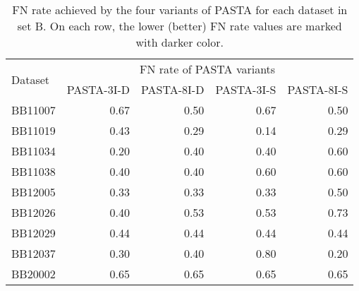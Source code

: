 \begin{table}[!htbp]
	\centering
	\small
	\caption{FN rate achieved by the four variants of PASTA for each dataset in set B. On each row, the lower (better) FN rate values are marked with darker color.}
	\begin{tabular}{|l|r|r|r|r|}
		\hline
		\multirow{2}{*}{Dataset} & \multicolumn{4}{c|}{FN rate of PASTA variants} \\
		\cline{2-5}          & \multicolumn{1}{l|}{PASTA-3I-D} & \multicolumn{1}{l|}{PASTA-8I-D} & \multicolumn{1}{l|}{PASTA-3I-S} & \multicolumn{1}{l|}{PASTA-8I-S} \\
		\hline
		BB11007 & \cellcolor[rgb]{ .988,  1,  .992}0.67 & \cellcolor[rgb]{ .384,  .745,  .478}0.50 & \cellcolor[rgb]{ .988,  1,  .992}0.67 & \cellcolor[rgb]{ .384,  .745,  .478}0.50 \\
		\hline
		BB11019 & \cellcolor[rgb]{ .988,  1,  .992}0.43 & \cellcolor[rgb]{ .682,  .871,  .733}0.29 & \cellcolor[rgb]{ .384,  .745,  .478}0.14 & \cellcolor[rgb]{ .682,  .871,  .733}0.29 \\
		\hline
		BB11034 & \cellcolor[rgb]{ .384,  .745,  .478}0.20 & \cellcolor[rgb]{ .686,  .871,  .733}0.40 & \cellcolor[rgb]{ .686,  .871,  .733}0.40 & \cellcolor[rgb]{ .988,  1,  .992}0.60 \\
		\hline
		BB11038 & \cellcolor[rgb]{ .384,  .745,  .478}0.40 & \cellcolor[rgb]{ .384,  .745,  .478}0.40 & \cellcolor[rgb]{ .988,  1,  .992}0.60 & \cellcolor[rgb]{ .988,  1,  .992}0.60 \\
		\hline
		BB12005 & \cellcolor[rgb]{ .384,  .745,  .478}0.33 & \cellcolor[rgb]{ .384,  .745,  .478}0.33 & \cellcolor[rgb]{ .384,  .745,  .478}0.33 & \cellcolor[rgb]{ .988,  1,  .992}0.50 \\
		\hline
		BB12026 & \cellcolor[rgb]{ .384,  .745,  .478}0.40 & \cellcolor[rgb]{ .624,  .843,  .682}0.53 & \cellcolor[rgb]{ .624,  .843,  .682}0.53 & \cellcolor[rgb]{ .988,  1,  .992}0.73 \\
		\hline
		BB12029 & \cellcolor[rgb]{ .988,  1,  .992}0.44 & \cellcolor[rgb]{ .988,  1,  .992}0.44 & \cellcolor[rgb]{ .988,  1,  .992}0.44 & \cellcolor[rgb]{ .988,  1,  .992}0.44 \\
		\hline
		BB12037 & \cellcolor[rgb]{ .482,  .784,  .561}0.30 & \cellcolor[rgb]{ .584,  .827,  .647}0.40 & \cellcolor[rgb]{ .988,  1,  .992}0.80 & \cellcolor[rgb]{ .384,  .745,  .478}0.20 \\
		\hline
		BB20002 & \cellcolor[rgb]{ .988,  1,  .992}0.65 & \cellcolor[rgb]{ .988,  1,  .992}0.65 & \cellcolor[rgb]{ .988,  1,  .992}0.65 & \cellcolor[rgb]{ .988,  1,  .992}0.65 \\

\end{tabular}
\end{table}
